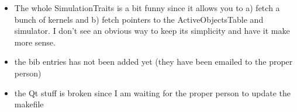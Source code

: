 \begin{itemize}
\item The whole SimulationTraits is a bit funny since it allows you to
  a) fetch a bunch of kernels and b) fetch pointers to the
  ActiveObjectsTable and simulator. I don't see an obvious way to keep
  its simplicity and have it make more sense.

\item the bib entries has not been added yet (they have been emailed to the proper person)

\item the Qt stuff is broken since I am waiting for the proper person to update the makefile


\end{itemize}

